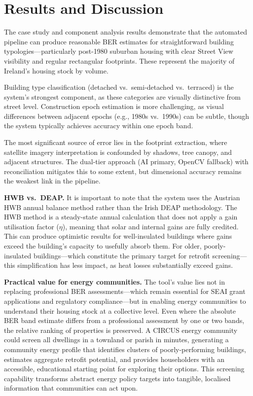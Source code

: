 \documentclass[preprint,12pt,authoryear]{elsarticle}
\begin{document}
\section{Results and Discussion}
\label{sec:results}

The case study and component analysis results demonstrate that the automated pipeline can produce reasonable BER estimates for straightforward building typologies---particularly post-1980 suburban housing with clear Street View visibility and regular rectangular footprints. These represent the majority of Ireland's housing stock by volume.

Building type classification (detached vs.\ semi-detached vs.\ terraced) is the system's strongest component, as these categories are visually distinctive from street level. Construction epoch estimation is more challenging, as visual differences between adjacent epochs (e.g., 1980s vs.\ 1990s) can be subtle, though the system typically achieves accuracy within one epoch band.

The most significant source of error lies in the footprint extraction, where satellite imagery interpretation is confounded by shadows, tree canopy, and adjacent structures. The dual-tier approach (AI primary, OpenCV fallback) with reconciliation mitigates this to some extent, but dimensional accuracy remains the weakest link in the pipeline.

\textbf{HWB vs.\ DEAP.} It is important to note that the system uses the Austrian HWB annual balance method rather than the Irish DEAP methodology. The HWB method is a steady-state annual calculation that does not apply a gain utilisation factor ($\eta$), meaning that solar and internal gains are fully credited. This can produce optimistic results for well-insulated buildings where gains exceed the building's capacity to usefully absorb them. For older, poorly-insulated buildings---which constitute the primary target for retrofit screening---this simplification has less impact, as heat losses substantially exceed gains.

\textbf{Practical value for energy communities.} The tool's value lies not in replacing professional BER assessments---which remain essential for SEAI grant applications and regulatory compliance---but in enabling energy communities to understand their housing stock at a collective level. Even where the absolute BER band estimate differs from a professional assessment by one or two bands, the relative ranking of properties is preserved. A CIRCUS energy community could screen all dwellings in a townland or parish in minutes, generating a community energy profile that identifies clusters of poorly-performing buildings, estimates aggregate retrofit potential, and provides householders with an accessible, educational starting point for exploring their options. This screening capability transforms abstract energy policy targets into tangible, localised information that communities can act upon.
\end{document}
